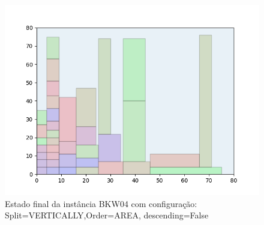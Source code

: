 \begin{figure}[H]
    \centering
    \caption[]{Estado final da instância BKW04 com configuração: Split=VERTICALLY,Order=AREA, descending=False}
    \label{fig:bkw04-vertically-area-false}
    \includegraphics[scale=0.5]{output/figures/bkw/bkw04/vertically/area/false/00}
\end{figure}